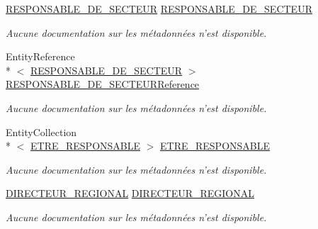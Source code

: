 \begin{DoxyCompactItemize}
\hyperlink{class_model_1_1_r_e_s_p_o_n_s_a_b_l_e___d_e___s_e_c_t_e_u_r}{R\-E\-S\-P\-O\-N\-S\-A\-B\-L\-E\-\_\-\-D\-E\-\_\-\-S\-E\-C\-T\-E\-U\-R} \hyperlink{class_model_1_1_c_o_l_l_a_b_o_r_a_t_e_u_r_a6bd320a8198906e4cfadc9427bf6e351}{R\-E\-S\-P\-O\-N\-S\-A\-B\-L\-E\-\_\-\-D\-E\-\_\-\-S\-E\-C\-T\-E\-U\-R}
\begin{DoxyCompactList}\small\item\em Aucune documentation sur les métadonnées n'est disponible. \end{DoxyCompactList}\item 
Entity\-Reference\\*
$<$ \hyperlink{class_model_1_1_r_e_s_p_o_n_s_a_b_l_e___d_e___s_e_c_t_e_u_r}{R\-E\-S\-P\-O\-N\-S\-A\-B\-L\-E\-\_\-\-D\-E\-\_\-\-S\-E\-C\-T\-E\-U\-R} $>$ \hyperlink{class_model_1_1_c_o_l_l_a_b_o_r_a_t_e_u_r_a9a393db2beea3bd82c900349c146cffd}{R\-E\-S\-P\-O\-N\-S\-A\-B\-L\-E\-\_\-\-D\-E\-\_\-\-S\-E\-C\-T\-E\-U\-R\-Reference}
\begin{DoxyCompactList}\small\item\em Aucune documentation sur les métadonnées n'est disponible. \end{DoxyCompactList}\item 
Entity\-Collection\\*
$<$ \hyperlink{class_model_1_1_e_t_r_e___r_e_s_p_o_n_s_a_b_l_e}{E\-T\-R\-E\-\_\-\-R\-E\-S\-P\-O\-N\-S\-A\-B\-L\-E} $>$ \hyperlink{class_model_1_1_c_o_l_l_a_b_o_r_a_t_e_u_r_a320ee68fff653feb60dfebf5665fb8e0}{E\-T\-R\-E\-\_\-\-R\-E\-S\-P\-O\-N\-S\-A\-B\-L\-E}
\begin{DoxyCompactList}\small\item\em Aucune documentation sur les métadonnées n'est disponible. \end{DoxyCompactList}\item 
\hyperlink{class_model_1_1_d_i_r_e_c_t_e_u_r___r_e_g_i_o_n_a_l}{D\-I\-R\-E\-C\-T\-E\-U\-R\-\_\-\-R\-E\-G\-I\-O\-N\-A\-L} \hyperlink{class_model_1_1_c_o_l_l_a_b_o_r_a_t_e_u_r_a62ee9e9f4ad746037e8d90abc144bcc0}{D\-I\-R\-E\-C\-T\-E\-U\-R\-\_\-\-R\-E\-G\-I\-O\-N\-A\-L}
\begin{DoxyCompactList}\small\item\em Aucune documentation sur les métadonnées n'est disponible. \end{DoxyCompactList}\item 

\end{DoxyCompactItemize}
